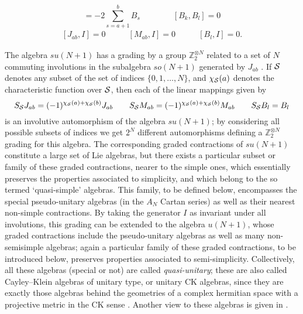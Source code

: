 \documentclass[12pt]{article}
\begin{document}
\begin{equation}
[{J}_{ab},{M}_{ab}] =-2\sum_{s=a+1}^b {B}_s  \qquad\qquad
[{B}_{k},{B}_{l}]=0
\label{suCR}
\end{equation}
\begin{equation}
\begin{array}{lll}
[{J}_{ab},{I}] = 0 & \qquad
[{M}_{ab},{I}] = 0 & \qquad
[{B}_l,{I}] = 0 .
\end{array}
\label{uCR}
\end{equation}

The algebra $su(N+1)$ has a grading by a group
$\mathbb{Z}_2^{\otimes N}$
related to a set of $N$ commuting involutions in the
subalgebra $so(N+1)$ generated by ${J}_{ab}$
\cite{Her.Mon.Olm.San:94,Her.San:96b}.
If ${{\cal S}}$ denotes any subset of the set of indices $\{0, 1, \dots, N\}$,
and $\chi_{{\cal S}}(a)$ denotes the characteristic function over ${{\cal S}}$,
then each of the linear mappings given by
\begin{equation}
S_{{\cal S}} {J}_{ab} = (-1)^{\chi_{{\cal S}}(a) + \chi_{{\cal S}}(b)} {J}_{ab}  \qquad
S_{{\cal S}} {M}_{ab} = (-1)^{\chi_{{\cal S}}(a) + \chi_{{\cal S}}(b)} {M}_{ab}  \qquad
S_{{\cal S}} {B}_{l} =  {B}_{l}
\end{equation}
is an involutive automorphism of the algebra $su(N+1)$; by
considering all possible subsets of indices we get $2^N$ different
automorphisms defining a $\mathbb{Z}_2^{\otimes N}$ grading for this
algebra. The corresponding graded contractions of
$su(N+1)$ constitute a large set of Lie algebras, but there exists
a particular subset or family of these graded contractions, nearer
to the simple ones, which essentially
preserves the properties
associated to simplicity, and which belong to the so termed
\cite{Roz:88, Roz:97} `quasi-simple' algebras. This family, to be defined
below, encompasses the special pseudo-unitary algebras (in the $A_N$ Cartan
series)  as well as their nearest non-simple contractions. By taking the
generator ${I}$ as invariant under all involutions, this grading can
be extended to the algebra $u(N+1)$, whose graded contractions include the
pseudo-unitary algebras as well as many non-semisimple algebras;  again a
particular family of these graded contractions, to be introduced below,
preserves properties associated to semi-simplicity.  Collectively, all these
algebras (special or not) are called
\emph{quasi-unitary}; these are also called Cayley--Klein algebras of unitary
type, or unitary CK algebras, since they are exactly those
algebras behind the geometries of a complex hermitian space  with a
projective metric in the CK sense \cite{Roz:97}. Another
view to these algebras is given in \cite{Gro.Man:90}.
\end{document}
